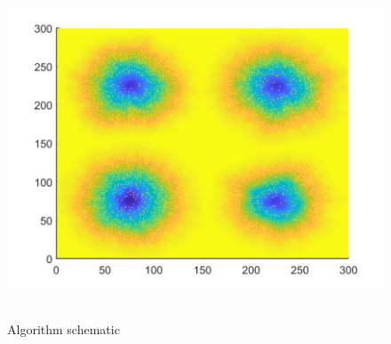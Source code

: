 \documentclass{mcmthesis}
\begin{document}
\begin{figure}[H] 
	\centering 
	\includegraphics[height=10cm]{./T5Figure/K1N2/K1N2L.pdf}
	\caption{Algorithm schematic}
\end{figure}
\end{document}
